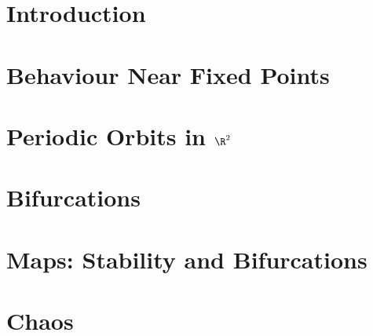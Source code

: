 \documentclass[british,11pt,a4paper]{report}
\begin{document}
\maketitle
\tableofcontents

\chapter{Introduction}

\chapter{Behaviour Near Fixed Points}

\chapter{Periodic Orbits in \texorpdfstring{$\R^2$}{the Plane}}

\chapter{Bifurcations}

\chapter{Maps: Stability and Bifurcations}

\chapter{Chaos}

\end{document}
